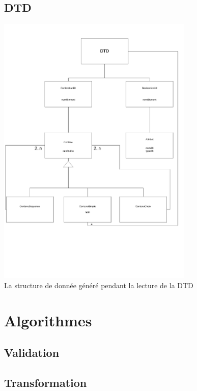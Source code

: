     \subsection{DTD}
        \includegraphics[width=0.7\textwidth]{img/ClassesDTD.pdf}\\
        La structure de donnée généré pendant la lecture de la DTD
        
\section{Algorithmes}

    \subsection{Validation}
        
    \subsection{Transformation}
